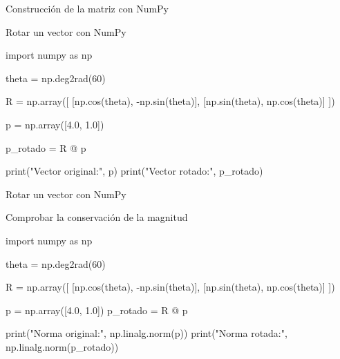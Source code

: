 \documentclass[aspectratio=169]{beamer}
\begin{document}
\begin{frame}{Construcción de la matriz con NumPy}


    \vspace{0.3cm}


\end{frame}

\begin{frame}[fragile]{Rotar un vector con NumPy}

    \begin{pythoncodedark}
        import numpy as np

        theta = np.deg2rad(60)

        R = np.array([
            [np.cos(theta), -np.sin(theta)],
            [np.sin(theta),  np.cos(theta)]
            ])

        p = np.array([4.0, 1.0])

        p_rotado = R @ p

        print("Vector original:", p)
        print("Vector rotado:", p_rotado)
    \end{pythoncodedark}

\end{frame}

\begin{frame}{Rotar un vector con NumPy}


    \vspace{0.3cm}


\end{frame}

\begin{frame}[fragile]{Comprobar la conservación de la magnitud}

    \begin{pythoncodedark}
        import numpy as np

        theta = np.deg2rad(60)

        R = np.array([
            [np.cos(theta), -np.sin(theta)],
            [np.sin(theta),  np.cos(theta)]
            ])

        p = np.array([4.0, 1.0])
        p_rotado = R @ p

        print("Norma original:", np.linalg.norm(p))
        print("Norma rotada:", np.linalg.norm(p_rotado))
    \end{pythoncodedark}

\end{frame}
\end{document}
